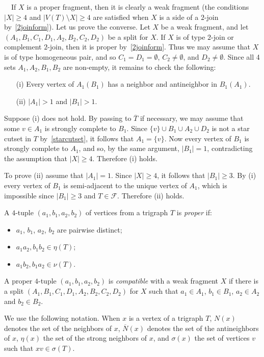 \documentclass[11 pt] {article}
\newcommand\blackslug{\hbox{\hskip 1pt \vrule width 4pt height 8pt depth 1.5pt
        \hskip 1pt}}
\newcommand\bbox{\hfill \quad \blackslug \medbreak}
\newcounter{claim}
\newcommand{\Proof}{\setcounter{claim}{0}\noindent{\bf Proof.}\ \ }
\begin{document}
\Proof If $X$ is a proper fragment, then it is clearly a weak fragment (the
conditions $|X| \geq 4$ and $|V(T) \setminus X| \geq 4$ are satisfied
when $X$ is a side of a $2$-join by~\ref{2joinform}).  Let us prove the
converse. Let $X$ be a weak fragment, and let 
$(A_1,B_1,C_1,D_1, A_2,B_2,C_2,D_2)$ be a split for $X$. If $X$
is of type $2$-join  or complement $2$-join, then  it is proper
by~\ref{2joinform}. Thus we may assume that $X$ is
of type homogeneous pair, and so
$C_1=D_1=\emptyset$, $C_2 \neq \emptyset$, and $D_2 \neq \emptyset$.
Since all 4 sets $A_1,A_2,B_1,B_2$ are non-empty, it remains to check the
following:
\begin{itemize}
\item[(i)] Every vertex of $A_1 (B_1)$ has a neighbor and antineighbor
in $B_1(A_1)$. 
\item[(ii)] $|A_1|>1$ and $|B_1|>1$.
\end{itemize}
 

Suppose (i) does not hold. By passing to $\overline{T}$ if necessary,
we may assume that some $v \in A_1$ is strongly complete to
$B_1$. Since $\{v\} \cup B_1 \cup A_2 \cup D_2$ is not a star cutset
in $T$ by~\ref{starcutset}, it follows that $A_1=\{v\}$. Now every
vertex of $B_1$ is strongly complete to $A_1$, and so, by the same
argument, $|B_1|=1$, contradicting the assumption that $|X|\geq
4$. Therefore (i) holds.

To prove (ii) assume that $|A_1|=1$. Since $|X|\geq 4$, it follows that $|B_1|\geq 3$.
By (i)  every vertex
of $B_1$ is semi-adjacent to the unique vertex of $A_1$, which is impossible
since $|B_1|\geq 3$ and $T \in \mathcal{F}$. Therefore (ii) holds.
\bbox

A $4$-tuple $(a_1, b_1, a_2, b_2)$ of vertices from a trigraph $T$ is
\emph{proper} if:

\begin{itemize}
\item $a_1$, $b_1$, $a_2$, $b_2$ are pairwise distinct;
\item $a_1a_2, b_1b_2 \in \eta(T)$;
\item $a_1b_2, b_1a_2 \in \nu(T)$.
\end{itemize}

A proper $4$-tuple $(a_1, b_1, a_2, b_2)$ is \emph{compatible} with a
weak fragment $X$ if there is a split
$(A_1,B_1,C_1,D_1,A_2,B_2,C_2,D_2)$ for $X$ such that $a_1\in A_1$,
$b_1\in B_1$, $a_2\in A_2$ and $b_2\in B_2$.

We use the following notation. When $x$ is a vertex of a trigraph $T$,
$N(x)$ denotes the set of the neighbors of $x$, $\overline{N}(x)$
denotes the set of the antineighbors of $x$, $\eta(x)$ the set of the
strong neighbors of $x$, and $\sigma(x)$ the set of vertices $v$ such
that $xv \in \sigma(T)$.
\end{document}
